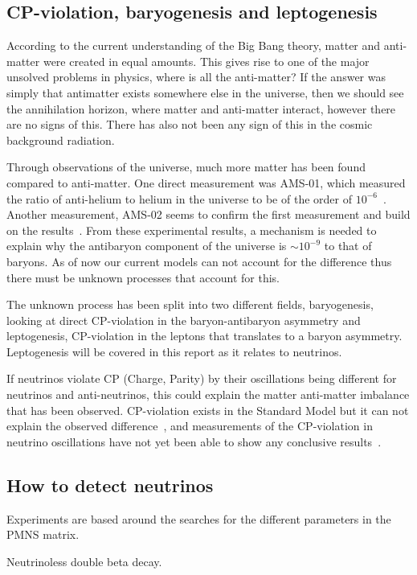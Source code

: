 \subsection{CP-violation, baryogenesis and leptogenesis}
According to the current understanding of the Big Bang theory, matter and anti-matter were created in equal amounts\cite{14Berry}. This gives rise to one of the major unsolved problems in physics, where is all the anti-matter? If the answer was simply that antimatter exists somewhere else in the universe, then we should see the annihilation horizon, where matter and anti-matter interact, however there are no signs of this. There has also not been any sign of this in the cosmic background radiation\cite{14Berry}.

Through observations of the universe, much more matter has been found compared to anti-matter. One direct measurement was AMS-01, which measured the ratio of anti-helium to helium in the universe to be of the order of $10^{-6}$~\cite{15AMS1}. Another measurement, AMS-02 seems to confirm the first measurement and build on the results~\cite{16AMS2}. 
From these experimental results, a mechanism is needed to explain why the antibaryon component of the universe is $\sim 10^{-9}$ to that of baryons. As of now our current models can not account for the difference thus there must be unknown processes that account for this.

The unknown process has been split into two different fields, baryogenesis, looking at direct CP-violation in the baryon-antibaryon asymmetry and leptogenesis, CP-violation in the leptons that translates to a baryon asymmetry. Leptogenesis will be covered in this report as it relates to neutrinos.

If neutrinos violate CP (Charge, Parity) by their oscillations being different for neutrinos and anti-neutrinos, this could explain the matter anti-matter imbalance that has been observed. CP-violation exists in the Standard Model but it can not explain the observed difference~\cite{3Peskin}, and measurements of the CP-violation in neutrino oscillations have not yet been able to show any conclusive results~\cite{17Gonzalez}.

\subsection{How to detect neutrinos}
Experiments are based around the searches for the different parameters in the PMNS matrix. 

Neutrinoless double beta decay.

